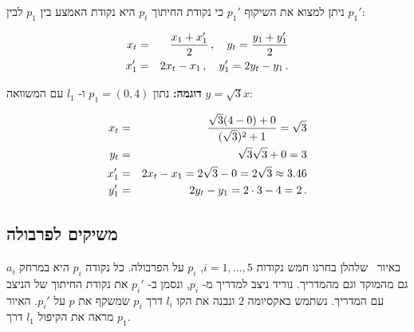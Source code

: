 ניתן למצוא את השיקוף
$p_1'$
כי נקודת החיתוך
$p_t$
היא נקודת האמצע בין
$p_1$
לבין
$p_1'$:




\begin{eqnarray*}
x_t&=&\displaystyle\frac{x_1+x_1'}{2}\,,\quad y_t=\displaystyle\frac{y_1+y_1'}{2}\\
x_1'&=&2x_t-x_1\,,\quad y_1'=2y_t-y_1\,.
\end{eqnarray*}



\textbf{דוגמה:}
נתון
$p_1=(0,4)$
ו-%
$l_1$
עם המשוואה
$y=\sqrt{3}x$:

\begin{eqnarray*}
x_t&=&\displaystyle\frac{\sqrt{3}(4-0)+0}{(\sqrt{3})^2+1}=\sqrt{3}\\
y_t&=&\sqrt{3}\sqrt{3}+0=3\\
x_1'&=&2x_t-x_1=2\sqrt{3}-0=2\sqrt{3}\approx 3.46\\
y_1'&=&2y_t-y_1=2\cdot 3 - 4 = 2\,.
\end{eqnarray*}



\subsection{משיקים לפרבולה}\label{s.parabola}

באיור~%
שלהלן
בחרנו חמש נקודות
$i=1,\ldots,5$, $p_i$
על הפרבולה. כל נקודה
$p_i$
היא במרחק
$a_i$
גם מהמוקד וגם מהמדריך. נוריד ניצב למדריך מ-%
$p_i$,
ונסמן ב-%
$p_i'$
את נקודת החיתוך של הניצב עם המדריך. נשתמש באקסיומה $2$ ונבנה את הקו 
$l_i$
דרך
$p_i$
שמשקף את 
$p$
על
$p_i'$.
האיור מראה את הקיפול 
$l_1$
דרך 
$p_1$.

